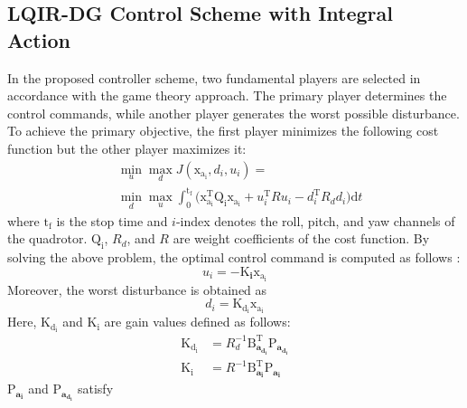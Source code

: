 \documentclass[peerreview]{IEEEtran}
\begin{document}
\subsection{LQIR-DG Control Scheme with Integral Action}
\noindent In the proposed controller scheme, two fundamental players are selected in accordance with the game theory approach. The primary player determines the control commands, while another player generates the worst possible disturbance.
To achieve the primary objective, the first player minimizes the following cost function but the other player maximizes it:
\begin{equation}\label{eq:min_max_cost_function}
	\begin{split}
		&\min_{u} \max_{d} J(\boldsymbol{\mathrm{x_{a_i}}}, {d_i}, {u_i})= \\ 
		&\min_{d} \max_{u}
		\int_{0}^{\mathrm{t_f}}\biggl (\boldsymbol{\mathrm{x^\mathrm{T}_{a_i}}}  \boldsymbol{\mathrm{Q_i}} \boldsymbol{\mathrm{x_{a_i}}}+
	   {{u^\mathrm{T}_i}}  {{R}} {{u_i}}-
	   {{d^\mathrm{T}_{i}}} {{ R_{d} d_{i}}}
	   \biggl )\mathrm{d}t
	\end{split}
\end{equation}
where $\mathrm{t_f}$ is the stop time and $i$-index denotes the roll, pitch, and yaw channels of the quadrotor. $\boldsymbol{\mathrm{Q_i}}$, ${{R_{d}}}$, and ${{R}}$ are weight coefficients of the cost function.
By solving the above problem, the optimal control command is computed as follows \cite{LQDG}:
\begin{equation}
	{{u_i}} = -\boldsymbol{{\mathrm{K}}_{i}} \boldsymbol{{\mathrm{x_{a_i}}}}
\end{equation}
Moreover, the worst disturbance is obtained as
\begin{equation}
	{{d_i}} =\boldsymbol{{\mathrm{K_{d_i}}}}\boldsymbol{{\mathrm{x_{a_i}}}}
\end{equation}
Here, $\boldsymbol{{\mathrm{K_{d_i}}}}$ and $\boldsymbol{{\mathrm{K_i}}}$ are gain values defined as follows:
\begin{align}
	\boldsymbol{{\mathrm{K_{d_i}}}} &= {{{R}}^{-1}_{d}}\boldsymbol{{\mathrm{B}_{a_{d_i}}^\mathrm{T}}}\boldsymbol{{\mathrm{P}}_{a_{d_i}}}\\
	\boldsymbol{{\mathrm{K_i}}} &= {{{R}}^{-1}}\boldsymbol{{\mathrm{B}_{a_i}^\mathrm{T}}}\boldsymbol{{\mathrm{P}}_{a_i}}
\end{align}
$\boldsymbol{{\mathrm{P}}_{a_i}}$ and $\boldsymbol{{\mathrm{P}}_{a_{d_i}}}$ satisfy
\end{document}
